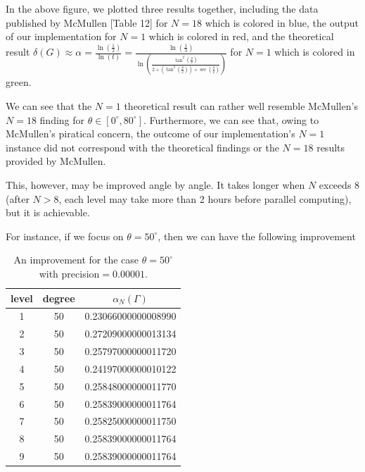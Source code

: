 \documentclass[12pt,oneside]{sfsuthesis}
\theoremstyle{plain} %
\theoremstyle{definition}  %
\theoremstyle{remark}  %
\theoremstyle{plain}
\begin{document}
{In the above figure, we plotted three results together, including the data published by McMullen \cite{mcmullen1998hausdorff}[Table 12] for $N=18$ which is colored in blue, the output of our implementation for $N=1$ which is colored in red, and the theoretical result $
\delta(G)\approx \alpha=\frac{\ln\left(\frac{1}{2}\right)}{\ln\left(t \right)}
=\frac{\ln\left(\frac{1}{3}\right)}{\ln\left(\frac{\tan^2\left(\frac{\theta}{2}\right)}{2+\left(\tan^2\left(\frac{\theta}{2}\right)\right)+\sec\left(\frac{\theta}{2}\right)} \right)}
$ for $N=1$ which is colored in green.


We can see that the $N=1$ theoretical result can rather well resemble McMullen's $N=18$ finding\cite{mcmullen1998hausdorff} for $\theta\in [0^\circ,80^\circ]$. Furthermore, we can see that, owing to McMullen's piratical concern, the outcome of our implementation's $N=1$ instance did not correspond with the theoretical findings or the $N=18$ results provided by McMullen.


This, however, may be improved angle by angle. It takes longer when $N$ exceeds $8$ (after $N>8$, each level may take more than 2 hours before parallel computing), but it is achievable.

For instance, if we focus on $\theta=50^\circ$, then we can have the following improvement
\begin{center}
\begin{table}[h]
\begin{tabular}{ c c c }
\hline
 level & degree & $\alpha_N(\Gamma)$ \\ \hline

 1 & 50 & 0.23066000000008990 \\
 2 & 50 & 0.27209000000013134 \\
 3 & 50 & 0.25797000000011720 \\
 4 & 50 & 0.24197000000010122 \\
 5 & 50 & 0.25848000000011770 \\
 6 & 50 & 0.25839000000011764 \\
 7 & 50 & 0.25825000000011750 \\  
 8 & 50 & 0.25839000000011764 \\  
 9 & 50 & 0.25839000000011764 \\ \hline
 
\end{tabular}
\caption{An improvement for the case $\theta=50^\circ$ with precision$=0.00001$.}
    \label{tab:McMullen1}   
\end{table}
\end{center}

}
\end{document}
